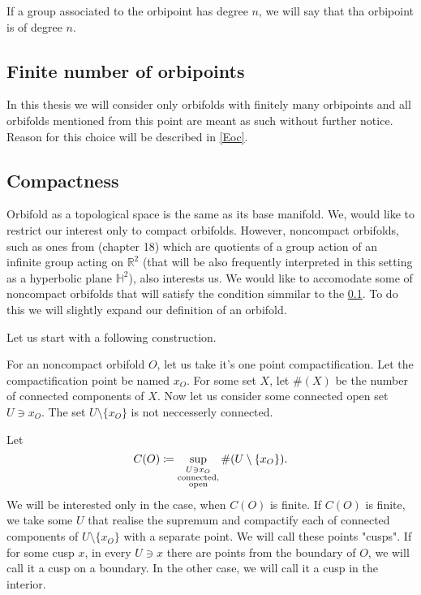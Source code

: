 If a group associated to the orbipoint has degree $n$, we will say that tha orbipoint is 
of degree $n$. 
\subsection{Finite number of orbipoints}\label{finite number of orbipoints}
In this thesis we will consider only orbifolds with finitely many orbipoints and all orbifolds 
mentioned from this point are meant as such without further notice. Reason for this 
choice will be described in \ref{Eoc}.  

\subsection{Compactness}\label{compactness}
Orbifold as a topological space is the same as its base manifold.
We, would like to restrict our interest only to compact orbifolds. 
However, noncompact orbifolds, such as ones from \cite{Conway2016} (chapter 18) 
which are quotients 
of a group action of an infinite group acting on $\mathbb{R}^2$ (that will 
be also frequently interpreted in this setting as a hyperbolic plane $\mathbb{H}^2$), 
also interests us. We would like to accomodate some of noncompact orbifolds that 
will satisfy the condition simmilar to the \ref{finite number of orbipoints}. 
To do this we will slightly expand our definition of an orbifold. 

Let us start with a following construction.

For an noncompact orbifold $O$, let us take it's one point compactification. 
Let the compactification point be named $x_O$.  
For some set $X$, let $\#(X)$ be the number of connected components of $X$.
Now let us consider some connected open set $U \ni x_O$. The set $U\setminus\{x_O\}$ is 
not neccesserly connected.
 
Let 
\begin{equation}
C(O) \coloneqq \sup\limits_{\substack{U \ni x_O \\ \rm connected, \\ \rm open }} 
\#(U\setminus\{x_O\}).
\end{equation}
We will be interested only in the case, when $C(O)$ is finite.
If $C(O)$ is finite, we take some $U$ that realise the supremum and compactify each of 
connected components of $U\setminus\{x_O\}$ with a separate point. We will call these points 
"cusps". If for some cusp $x$, in every $U \ni x$ there are points from the boundary of $O$, 
we will call it a cusp on a boundary. In the other case, we will call it a cusp in the interior.

